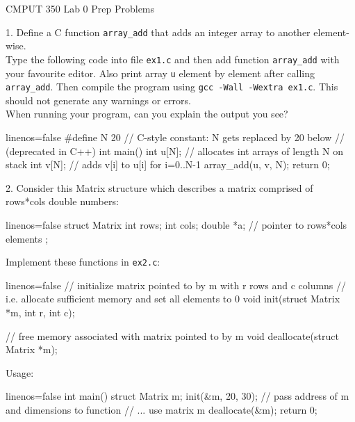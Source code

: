 \documentclass[a4paper,11pt]{article}
\begin{document}

\begin{center}
{\Large CMPUT 350 Lab 0 Prep Problems}
\end{center}

\linerule

1. Define a C function \texttt{array\_add} that adds an integer array to another element-wise. \\

Type the following code into file \texttt{ex1.c} and then add function
\texttt{array\_add} with your favourite editor. 
Also print array \texttt{u} element by element after calling \texttt{array\_add}. 
Then compile the program using \texttt{gcc -Wall -Wextra ex1.c}. 
This should not generate any warnings or errors. \\

When running your program, can you explain the output you see?

\begin{cppcode*}{linenos=false}
#define N 20   // C-style constant: N gets replaced by 20 below
               // (deprecated in C++)
int main() {
    int u[N]; // allocates int arrays of length N on stack
    int v[N];
    // adds v[i] to u[i] for i=0..N-1
    array_add(u, v, N);
    return 0;
}
\end{cppcode*}
 
\linerule

2. Consider this Matrix structure which describes a matrix comprised of rows*cols
double numbers:

\begin{cppcode*}{linenos=false}
struct Matrix {
    int rows;
    int cols;
    double *a;  // pointer to rows*cols elements
};
\end{cppcode*}

Implement these functions in \texttt{ex2.c}:
\begin{cppcode*}{linenos=false}
// initialize matrix pointed to by m with r rows and c columns
// i.e. allocate sufficient memory and set all elements to 0
void init(struct Matrix *m, int r, int c);

// free memory associated with matrix pointed to by m
void deallocate(struct Matrix *m);
\end{cppcode*}

Usage:

\begin{cppcode*}{linenos=false}
int main() {
    struct Matrix m;
    init(&m, 20, 30);  // pass address of m and dimensions to function
    // ... use matrix m
    deallocate(&m);
    return 0;
}
\end{cppcode*}
\end{document}
